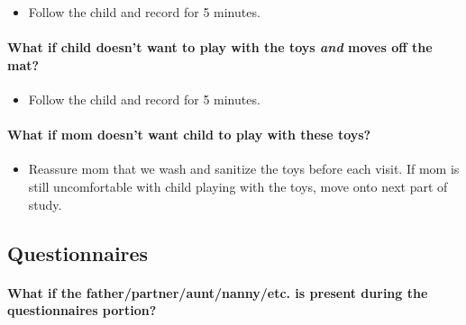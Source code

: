 \documentclass[
]{book}
\providecommand{\tightlist}{%
  \setlength{\itemsep}{0pt}\setlength{\parskip}{0pt}}
\begin{document}
\begin{itemize}
\tightlist
\item
  Follow the child and record for 5 minutes.
\end{itemize}

\hypertarget{what-if-child-doesnt-want-to-play-with-the-toys-and-moves-off-the-mat}{%
\paragraph*{\texorpdfstring{What if child doesn't want to play with the toys \emph{and} moves off the mat?}{What if child doesn't want to play with the toys and moves off the mat?}}\label{what-if-child-doesnt-want-to-play-with-the-toys-and-moves-off-the-mat}}

\begin{itemize}
\tightlist
\item
  Follow the child and record for 5 minutes.
\end{itemize}

\hypertarget{what-if-mom-doesnt-want-child-to-play-with-these-toys}{%
\paragraph*{What if mom doesn't want child to play with these toys?}\label{what-if-mom-doesnt-want-child-to-play-with-these-toys}}

\begin{itemize}
\tightlist
\item
  Reassure mom that we wash and sanitize the toys before each visit. If mom is still uncomfortable with child playing with the toys, move onto next part of study.
\end{itemize}

\hypertarget{faqs_questionnaires}{%
\subsection{Questionnaires}\label{faqs_questionnaires}}

\hypertarget{what-if-the-fatherpartnerauntnannyetc.-is-present-during-the-questionnaires-portion}{%
\paragraph*{What if the father/partner/aunt/nanny/etc. is present during the questionnaires portion?}\label{what-if-the-fatherpartnerauntnannyetc.-is-present-during-the-questionnaires-portion}}
\end{document}
